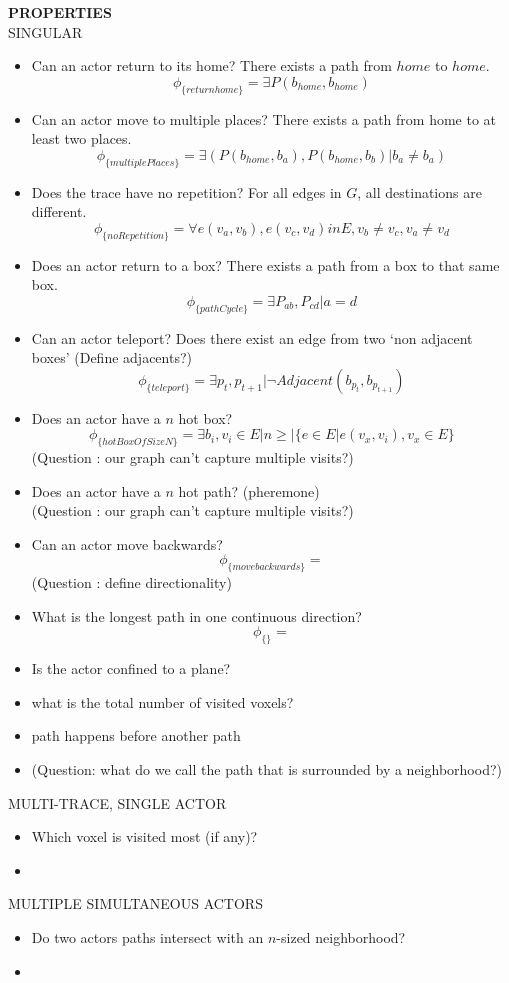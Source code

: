 \documentclass{article}
\begin{document}
\newpage
\textbf{PROPERTIES}\\
SINGULAR\\
\begin{itemize}
\item Can an actor return to its home?  There exists a path from $home$ to $home$.  
  $$\phi_{\{returnhome\}} = \exists P(b_{home}, b_{home})$$
\item Can an actor move to multiple places? There exists a path from home to at least two places.
  $$\phi_{\{multiplePlaces\}} = \exists (P(b_{home}, b_a), P(b_{home}, b_b)| b_a \neq b_a)$$

\item Does the trace have no repetition? For all edges in $G$, all destinations are different.
  $$\phi_{\{noRepetition\}} = \forall e(v_a, v_b), e(v_c,v_d) in E, v_b \neq v_c, v_a \neq v_d$$

\item Does an actor return to a box? There exists a path from a box to that same box.
  $$\phi_{\{pathCycle\}} = \exists P_{ab}, P_{cd} | a = d$$
\item Can an actor teleport? Does there exist an edge from two `non adjacent boxes'  (Define adjacents?)
  $$\phi_{\{teleport\}} = \exists  p_t, p_{t+1} | \lnot Adjacent(b_{p_t}, b_{p_{t+1}})$$
\item Does an actor have a $n$ hot box? 
  $$\phi_{\{hotBoxOfSizeN\}} = \exists b_i, v_i \in E | n \geq |\{e \in E | e(v_x, v_i), v_x \in E\}$$
  (Question : our graph can't capture multiple visits?)
\item Does an actor have a $n$ hot path? (pheremone)\\
  (Question : our graph can't capture multiple visits?)
\item Can an actor move backwards?
  $$\phi_{\{movebackwards\}} = $$
  (Question : define directionality)
\item What is the longest path in one continuous direction?
  $$\phi_{\{\}} = $$
\item Is the actor confined to a plane?
\item what is the total number of visited voxels?
\item path happens before another path
\item (Question: what do we call the path that is surrounded by a neighborhood?)
\end{itemize}

MULTI-TRACE, SINGLE ACTOR\\
\begin{itemize}
  \item Which voxel is visited most (if any)?
  \item 
\end{itemize}

MULTIPLE SIMULTANEOUS ACTORS\\
\begin{itemize}
  \item Do two actors paths intersect with an $n$-sized neighborhood?
  \item 
\end{itemize}

\end{document}
